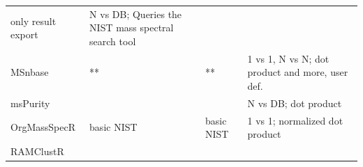 \documentclass[]{article}
\begin{document}
\begin{longtable}[]{@{}llll@{}}
\begin{minipage}[t]{0.17\columnwidth}
only result export\strut
\end{minipage} & \begin{minipage}[t]{0.46\columnwidth}\raggedright
N vs DB; Queries the NIST mass spectral search tool\strut
\end{minipage}\tabularnewline
\begin{minipage}[t]{0.09\columnwidth}\raggedright
MSnbase\strut
\end{minipage} & \begin{minipage}[t]{0.17\columnwidth}\raggedright
**\strut
\end{minipage} & \begin{minipage}[t]{0.17\columnwidth}\raggedright
**\strut
\end{minipage} & \begin{minipage}[t]{0.46\columnwidth}\raggedright
1 vs 1, N vs N; dot product and more, user def.\strut
\end{minipage}\tabularnewline
\begin{minipage}[t]{0.09\columnwidth}\raggedright
msPurity\strut
\end{minipage} & \begin{minipage}[t]{0.17\columnwidth}\raggedright
\strut
\end{minipage} & \begin{minipage}[t]{0.17\columnwidth}\raggedright
\strut
\end{minipage} & \begin{minipage}[t]{0.46\columnwidth}\raggedright
N vs DB; dot product\strut
\end{minipage}\tabularnewline
\begin{minipage}[t]{0.09\columnwidth}\raggedright
OrgMassSpecR\strut
\end{minipage} & \begin{minipage}[t]{0.17\columnwidth}\raggedright
basic NIST\strut
\end{minipage} & \begin{minipage}[t]{0.17\columnwidth}\raggedright
basic NIST\strut
\end{minipage} & \begin{minipage}[t]{0.46\columnwidth}\raggedright
1 vs 1; normalized dot product\strut
\end{minipage}\tabularnewline
\begin{minipage}[t]{0.09\columnwidth}\raggedright
RAMClustR\strut
\end{minipage} & \begin{minipage}[t]{0.17\columnwidth}\raggedright
\strut
\end{minipage} & \begin{minipage}[t]{0.17\columnwidth}\raggedright

\end{minipage}
\end{longtable}
\end{document}
